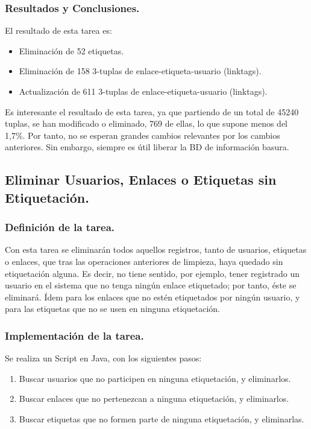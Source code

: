\subsubsection{Resultados y Conclusiones.}

El resultado de esta tarea es:
\begin{itemize}
\item    Eliminación de 52 etiquetas.
\item    Eliminación de 158 3-tuplas de enlace-etiqueta-usuario (linktags).
\item    Actualización de 611 3-tuplas de enlace-etiqueta-usuario (linktags).
\end{itemize}

Es interesante el resultado de esta tarea, ya que partiendo de un total de 45240 tuplas, se han modificado o eliminado, 769 de ellas, lo que supone menos del 1,7\%. Por tanto, no se esperan grandes cambios relevantes por los cambios anteriores. Sin embargo, siempre es útil liberar la BD de información basura.





\subsection{Eliminar Usuarios, Enlaces o Etiquetas sin Etiquetación.}

\subsubsection{Definición de la tarea.}

Con esta tarea se eliminarán todos aquellos registros, tanto de usuarios, etiquetas o enlaces, que tras las operaciones anteriores de limpieza, haya quedado sin etiquetación alguna. Es decir, no tiene sentido, por ejemplo, tener registrado un usuario en el sistema que no tenga ningún enlace etiquetado; por tanto, éste se eliminará. Ídem para los enlaces que no estén etiquetados por ningún usuario, y para las etiquetas que no se usen en ninguna etiquetación.

\subsubsection{Implementación de la tarea.}

Se realiza un Script en Java, con los siguientes pasos:
\begin{enumerate}
\item    Buscar usuarios que no participen en ninguna etiquetación, y eliminarlos.
\item    Buscar enlaces que no pertenezcan a ninguna etiquetación, y eliminarlos.
\item    Buscar etiquetas que no formen parte de ninguna etiquetación, y eliminarlas.
\end{enumerate}


